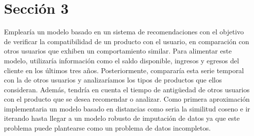 \documentclass[../main.tex]{subfiles}
\begin{document}
\section*{Sección 3}
Emplearía un modelo basado en un sistema de recomendaciones con el objetivo de verificar la compatibilidad de un producto con el usuario, en comparación con otros usuarios que exhiben un comportamiento similar. Para alimentar este modelo, utilizaría información como el saldo disponible, ingresos y egresos del cliente en los últimos tres años. Posteriormente, compararía esta serie temporal con la de otros usuarios y analizaríamos los tipos de productos que ellos consideran. Además, tendría en cuenta el tiempo de antigüedad de otros usuarios con el producto que se desea recomendar o analizar. Como primera aproximación implementaria un modelo basado en distancias como seria la similitud coseno e ir iterando hasta llegar a un modelo robusto de imputación de datos ya que este problema puede plantearse como un problema de datos incompletos.
\end{document}
